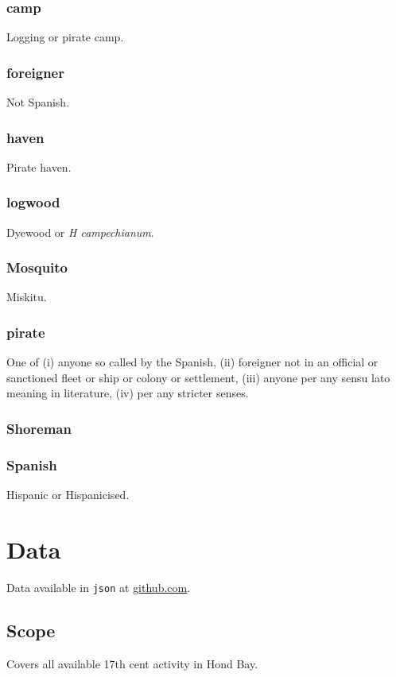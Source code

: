 \documentclass{amsart}
\newcommand{\code}[1]{\texttt{#1}}%
\newcommand{\foreign}[1]{\textit{#1}}%
\theoremstyle{definition}%
\theoremstyle{definition}%
\theoremstyle{remark}%
\theoremstyle{definition}%
\theoremstyle{definition}%
\begin{document}
\subsubsection{camp} Logging or pirate camp.%
%
\subsubsection{foreigner} Not Spanish.%
%
\subsubsection{haven} Pirate haven.%
%
\subsubsection{logwood} Dyewood or \foreign{H campechianum}.
%
\subsubsection{Mosquito} Miskitu.
%
\subsubsection{pirate}\label{term:pir} One of (i) anyone so called by the Spanish, (ii) foreigner not in an official or sanctioned fleet or ship or colony or settlement, (iii) anyone per any sensu lato meaning in literature, (iv) per any stricter senses.
%
\subsubsection{Shoreman}
%
\subsubsection{Spanish} Hispanic or Hispanicised.
%
%
%
%
\section{Data}
\label{s:data}
\lipsum[2][1-4]
Data available in \code{json} at \href{http://github.com/aenavidad/pp-0}{github.com}.
\subsection{Scope} Covers all available 17th cent activity in Hond Bay.
\end{document}
